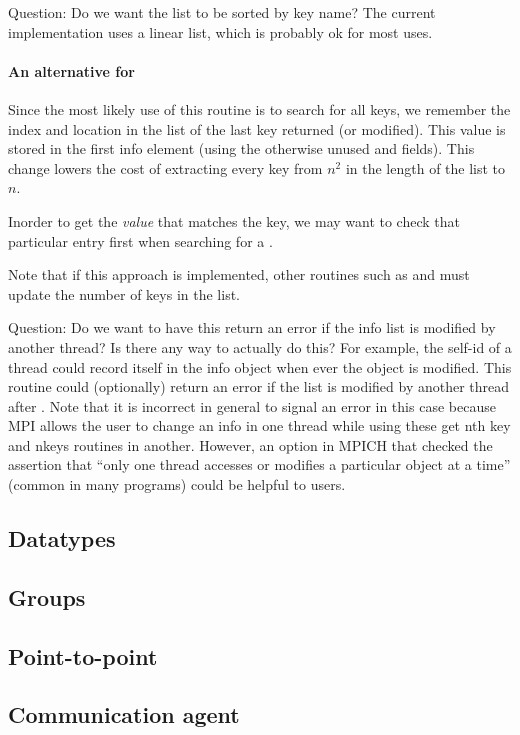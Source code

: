 \documentclass{article}
\begin{document}
Question: Do we want the list to be sorted by key name?  The current
implementation uses a linear list, which is probably ok for most uses.

\paragraph{An alternative for }

Since the most likely use of this routine is to search for all keys,
we remember the index and location in the list of the last key
returned (or modified).  This value is stored in the 
first info element (using the otherwise unused  and
 fields).  This change lowers the cost of extracting every 
key from $n^2$ in the length of the list to $n$.  

Inorder to get the
\emph{value} that matches the key, we may want to check that
particular entry first when searching for a .

Note that if this approach is implemented, other routines such as
 and  must update the number of keys
in the list.

Question:  Do we want to have this return an error if the info list is 
modified by another thread?  Is there any way to actually do this?  For
example, the self-id of a thread could record itself in the info object when
ever the object is modified.  This routine could (optionally) return an error
if the list is modified by another thread after .
Note that it is incorrect in general to signal an error in this case because
MPI allows the user to change an info in one thread while using these get nth
key and nkeys routines in another.  However, an option in MPICH that checked
the assertion that ``only one thread accesses or modifies a particular object
at a time'' (common in many programs) could be helpful to users.

\subsection{Datatypes}
\subsection{Groups}
\subsection{Point-to-point}  
\subsection{Communication agent}
\end{document}

